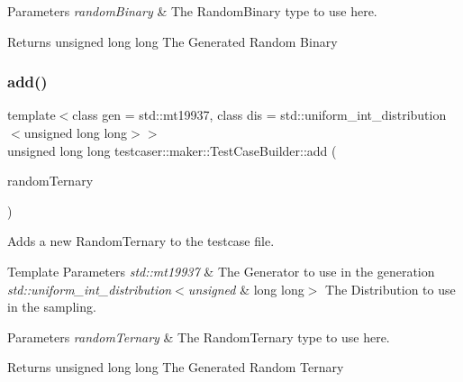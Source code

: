 \begin{DoxyParams}{Parameters}
{\em random\+Binary} & The Random\+Binary type to use here. \\
\hline
\end{DoxyParams}
\begin{DoxyReturn}{Returns}
unsigned long long The Generated Random Binary 
\end{DoxyReturn}
\mbox{\label{classtestcaser_1_1maker_1_1TestCaseBuilder_a4bab625f6da4431125ca3e9eb602eaad}} 
\subsubsection{\texorpdfstring{add()}{add()}\hspace{0.1cm}{\footnotesize\ttfamily [6/11]}}
{\footnotesize\ttfamily template$<$class gen  = std\+::mt19937, class dis  = std\+::uniform\+\_\+int\+\_\+distribution$<$unsigned long long$>$$>$ \\
unsigned long long testcaser\+::maker\+::\+Test\+Case\+Builder\+::add (\begin{DoxyParamCaption}\item[{\mbox{\hyperlink{structtestcaser_1_1maker_1_1types_1_1RandomTernary}{types\+::\+Random\+Ternary}}$<$ gen, dis $>$ \&}]{random\+Ternary }\end{DoxyParamCaption})\hspace{0.3cm}{\ttfamily [inline]}}



Adds a new Random\+Ternary to the testcase file. 


\begin{DoxyTemplParams}{Template Parameters}
{\em std\+::mt19937} & The Generator to use in the generation \\
\hline
{\em std\+::uniform\+\_\+int\+\_\+distribution$<$unsigned} & long long$>$ The Distribution to use in the sampling. \\
\hline
\end{DoxyTemplParams}

\begin{DoxyParams}{Parameters}
{\em random\+Ternary} & The Random\+Ternary type to use here. \\
\hline
\end{DoxyParams}
\begin{DoxyReturn}{Returns}
unsigned long long The Generated Random Ternary 
\end{DoxyReturn}
\mbox{\label{classtestcaser_1_1maker_1_1TestCaseBuilder_adcb4d6cfafbf67234818b0b68c586ad4}} 
